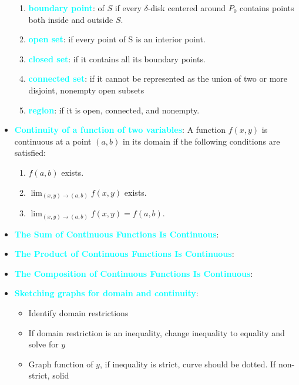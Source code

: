 \documentclass{report}
\begin{document}
\begin{itemize}
\begin{enumerate}[label=(\alph*)]
                    \item \textbf{\textcolor{cyan}{boundary point}}: of $S$ if every $\delta$-disk centered around $P_0$ contains points both inside and outside $S$.
                    \item \textbf{\textcolor{cyan}{open set}}: if every point of S is an interior point. 
                    \item \textbf{\textcolor{cyan}{closed set}}: if it contains all its boundary points.
                    \item \textbf{\textcolor{cyan}{connected set}}: if it cannot be represented as the union of two or more disjoint, nonempty open subsets 
                    \item \textbf{\textcolor{cyan}{region}}: if it is open, connected, and nonempty.
                \end{enumerate}
                \bigbreak \noindent 
            \item \textbf{\textcolor{cyan}{Continuity of a function of two variables}}:
                A function $f(x,y)$ is continuous at a point $(a,b)$ in its domain if the following conditions are satisfied:
                \begin{enumerate}
                    \item $f(a,b)$ exists.
                    \item $\lim_{(x,y) \to (a,b)} f(x,y)$ exists.
                    \item $\lim_{(x,y) \to (a,b)} f(x,y) = f(a,b)$.
                \end{enumerate}
            \item \textbf{\textcolor{cyan}{The Sum of Continuous Functions Is Continuous}}:
            \item \textbf{\textcolor{cyan}{The Product of Continuous Functions Is Continuous}}:
            \item \textbf{\textcolor{cyan}{The Composition of Continuous Functions Is Continuous}}:
            \item \textbf{\textcolor{cyan}{Sketching graphs for domain and continuity}}:
                \begin{itemize}
                    \item Identify domain restrictions
                    \item If domain restriction is an inequality, change inequality to equality and solve for $y$
                    \item Graph function of $y$, if inequality is strict, curve should be dotted. If non-strict, solid

\end{itemize}
\end{itemize}
\end{document}
